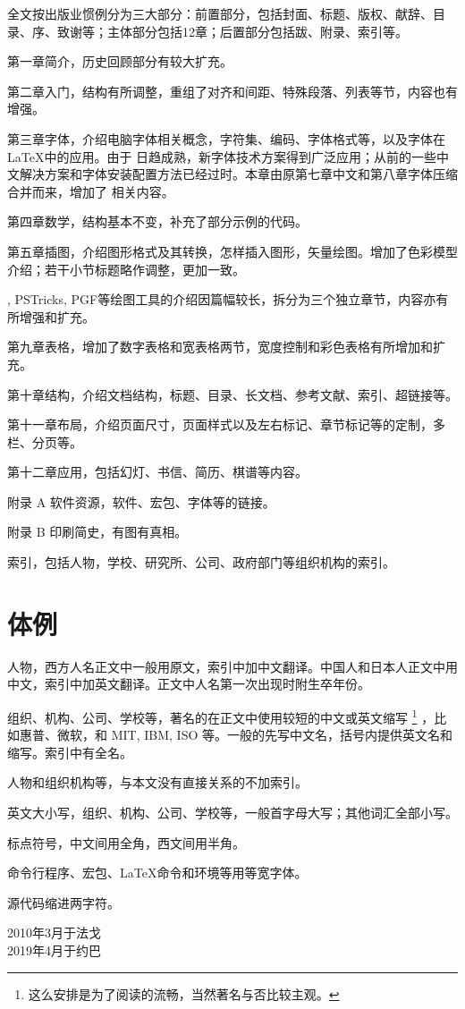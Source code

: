 \begin{compactenum}
  \item 全文按出版业惯例分为三大部分：前置部分，包括封面、标题、版权、献辞、目录、序、致谢等；主体部分包括12章；后置部分包括跋、附录、索引等。
  \item 第一章简介，历史回顾部分有较大扩充。
  \item 第二章入门，结构有所调整，重组了对齐和间距、特殊段落、列表等节，内容也有增强。
  \item 第三章字体，介绍电脑字体相关概念，字符集、编码、字体格式等，以及字体在 \LaTeX 中的应用。由于 \XeTeX 日趋成熟，新字体技术方案得到广泛应用；从前的一些中文解决方案和字体安装配置方法已经过时。本章由原第七章中文和第八章字体压缩合并而来，增加了 \XeTeX 相关内容。
  \item 第四章数学，结构基本不变，补充了部分示例的代码。
  \item 第五章插图，介绍图形格式及其转换，怎样插入图形，矢量绘图。增加了色彩模型介绍；若干小节标题略作调整，更加一致。
  \item \MP, PSTricks, PGF等绘图工具的介绍因篇幅较长，拆分为三个独立章节，内容亦有所增强和扩充。
  \item 第九章表格，增加了数字表格和宽表格两节，宽度控制和彩色表格有所增加和扩充。
  \item 第十章结构，介绍文档结构，标题、目录、长文档、参考文献、索引、超链接等。
  \item 第十一章布局，介绍页面尺寸，页面样式以及左右标记、章节标记等的定制，多栏、分页等。
  \item 第十二章应用，包括幻灯、书信、简历、棋谱等内容。
  \item 附录 A 软件资源，软件、宏包、字体等的链接。
  \item 附录 B 印刷简史，有图有真相。
  \item 索引，包括人物，学校、研究所、公司、政府部门等组织机构的索引。
\end{compactenum}

\section*{体例}

\begin{compactenum}
  \item 人物，西方人名正文中一般用原文，索引中加中文翻译。中国人和日本人正文中用中文，索引中加英文翻译。正文中人名第一次出现时附生卒年份。
  \item 组织、机构、公司、学校等，著名的在正文中使用较短的中文或英文缩写 \footnote{这么安排是为了阅读的流畅，当然著名与否比较主观。} ，比如惠普、微软，和 MIT, IBM, ISO 等。一般的先写中文名，括号内提供英文名和缩写。索引中有全名。
  \item 人物和组织机构等，与本文没有直接关系的不加索引。
  \item 英文大小写，组织、机构、公司、学校等，一般首字母大写；其他词汇全部小写。
  \item 标点符号，中文间用全角，西文间用半角。
  \item 命令行程序、宏包、\LaTeX 命令和环境等用等宽字体。
  \item 源代码缩进两字符。
\end{compactenum}

\begin{flushright}
  2010年3月于法戈\\
  2019年4月于约巴
\end{flushright}
